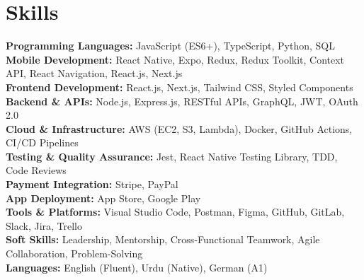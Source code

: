 \section{Skills}
\vspace{2pt}
\resumeSubHeadingListStart
\small{\item{
\textbf{Programming Languages:} JavaScript (ES6+), TypeScript, Python, SQL \ \vspace{3pt}\\
\textbf{Mobile Development:} React Native, Expo, Redux, Redux Toolkit, Context API, React Navigation, React.js, Next.js \ \vspace{3pt}\\
\textbf{Frontend Development:} React.js, Next.js, Tailwind CSS, Styled Components \ \vspace{3pt}\\
\textbf{Backend \& APIs:} Node.js, Express.js, RESTful APIs, GraphQL, JWT, OAuth 2.0 \ \vspace{3pt}\\
\textbf{Cloud \& Infrastructure:} AWS (EC2, S3, Lambda), Docker, GitHub Actions, CI/CD Pipelines \ \vspace{3pt}\\
\textbf{Testing \& Quality Assurance:} Jest, React Native Testing Library, TDD, Code Reviews \ \vspace{3pt}\\
\textbf{Payment Integration:} Stripe, PayPal \ \vspace{3pt}\\
\textbf{App Deployment:} App Store, Google Play \ \vspace{3pt}\\
\textbf{Tools \& Platforms:} Visual Studio Code, Postman, Figma, GitHub, GitLab, Slack, Jira, Trello \ \vspace{3pt}\\
\textbf{Soft Skills:} Leadership, Mentorship, Cross-Functional Teamwork, Agile Collaboration, Problem-Solving \ \vspace{3pt}\\
\textbf{Languages:} English (Fluent), Urdu (Native), German (A1) \ \vspace{3pt}
}}
\resumeSubHeadingListEnd
